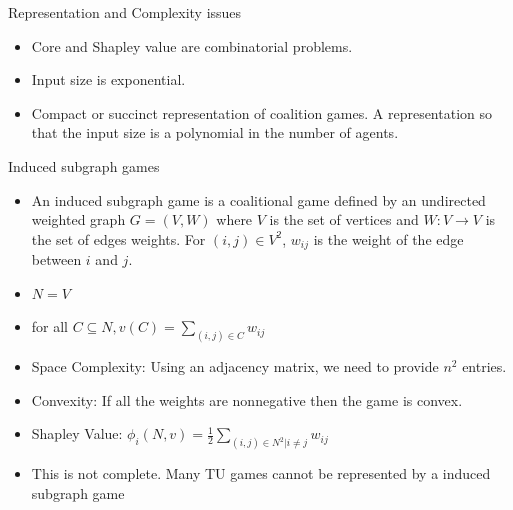 \documentclass{beamer}
\begin{document}
\begin{frame}{Representation and Complexity issues}
    \begin{itemize}
        \item Core and Shapley value are combinatorial problems.
        \item Input size is exponential.
        \item Compact or succinct representation of coalition games. A representation so that the input size is a polynomial in the number of agents.
    \end{itemize}
\end{frame}

\begin{frame}{Induced subgraph games}
    \begin{itemize}
        \item An induced subgraph game is a coalitional game defined by an undirected weighted graph $G = (V,W)$ where $V$ is the set of vertices and $W : V \rightarrow V$ is the set of edges weights. For $(i,j) \in V^2$, $w_{ij}$ is the weight of the edge between $i$ and $j$.
        \item $N = V$
        \item for all $C \subseteq N, v(C) = \sum_{(i,j) \in C} w_{ij}$
        \item {\color{red}Space Complexity:} Using an adjacency matrix, we need to provide $n^2$ entries.
        \item {\color{red}Convexity:} If all the weights are nonnegative then the game is convex.
        \item {\color{red}Shapley Value:} $\phi_i(N,v) = \frac{1}{2} \sum_{(i,j) \in N^2 | i \neq j}w_{ij}$
        \item This is {\color{red}not complete}. Many TU games cannot be represented by a induced subgraph game

    \end{itemize}
\end{frame}
\end{document}
